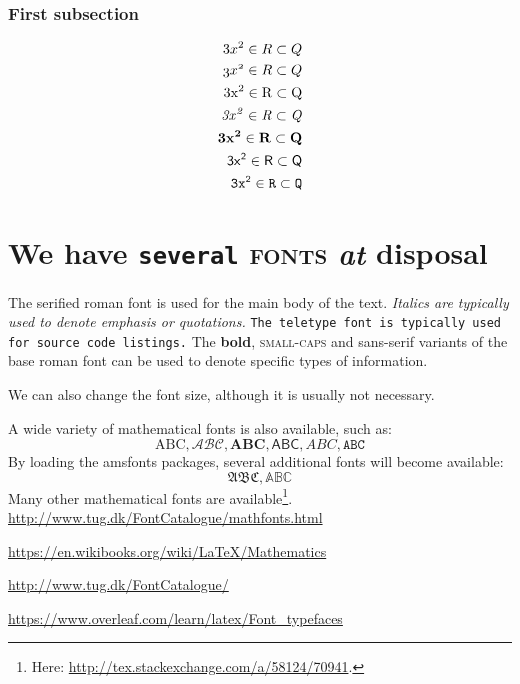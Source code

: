 \documentclass{nreport}
\begin{document}
\subsection{First subsection}

\lipsum[5]

\begin{align*}
3x^2 \in R \subset Q \\
\mathnormal{3x^2 \in R \subset Q} \\
\mathrm{3x^2 \in R \subset Q} \\
\mathit{3x^2 \in R \subset Q} \\
\mathbf{3x^2 \in R \subset Q} \\
\mathsf{3x^2 \in R \subset Q} \\
\mathtt{3x^2 \in R \subset Q} 
\end{align*}


\chapter{\textnormal{We \textsf{have} \texttt{several} \textsc{fonts}
  \textit{at} \textbf{disposal}}}
The serified roman font is used for the main body of the text.
\textit{Italics are typically used to denote emphasis or
quotations.} \texttt{The teletype font is typically used for source
code listings.} The \textbf{bold}, \textsc{small-caps} and
\textsf{sans-serif} variants of the base roman font can be used to
denote specific types of information.

\tiny We \scriptsize can \footnotesize also \small change \normalsize
the \large font \Large size, \LARGE although \huge it \Huge
is \huge usually \LARGE not \Large necessary.\normalsize

A wide variety of mathematical fonts is also available, such as: \[
  \mathrm{ABC}, \mathcal{ABC}, \mathbf{ABC}, \mathsf{ABC},
  \mathit{ABC}, \mathtt{ABC}
\] By loading the \textsf{amsfonts} packages, several additional
fonts will become available: \[
  \mathfrak{ABC}, \mathbb{ABC}
\] Many other mathematical fonts are available\footnote{
   Here: \url{http://tex.stackexchange.com/a/58124/70941}.
}.\\

\url{http://www.tug.dk/FontCatalogue/mathfonts.html}

\url{https://en.wikibooks.org/wiki/LaTeX/Mathematics}


\url{http://www.tug.dk/FontCatalogue/}

\url{https://www.overleaf.com/learn/latex/Font_typefaces}
\end{document}
